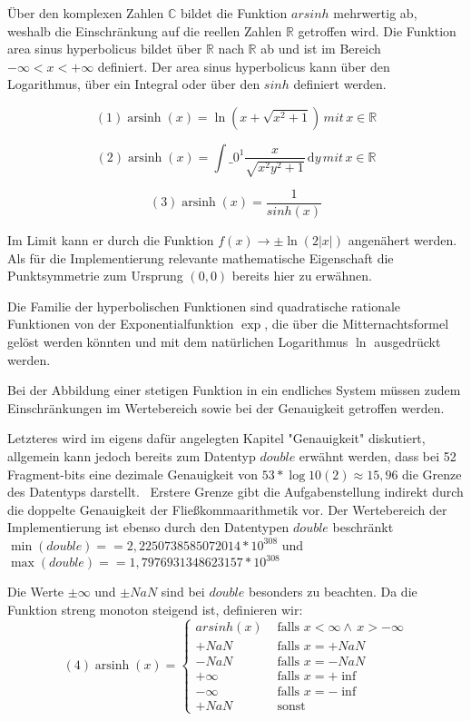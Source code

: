 \documentclass[course=erap] {aspdoc}
\begin{document}
    Über den komplexen Zahlen $\mathbb{C}$ bildet die Funktion $arsinh$ mehrwertig ab, weshalb die Einschränkung auf die reellen Zahlen $\mathbb{R}$ getroffen wird.
    Die Funktion area sinus hyperbolicus bildet über $\mathbb{R}$ nach $\mathbb{R}$ ab und ist im Bereich $-\infty < x < + \infty$ definiert.
    Der area sinus hyperbolicus kann über den Logarithmus, über ein Integral oder über den $sinh$ definiert werden.

    $$ (1) \operatorname{arsinh}(x) = \ln \left(x + \sqrt{x^2 + 1} \right) \, mit \, x \in \mathbb{R}$$

    $$ (2) \operatorname{arsinh}(x) = \int\_{0}^{1} \frac{x}{\sqrt{x^2 y^2 + 1}} \,\mathrm{d}y \, mit \, x \in \mathbb{R} $$

    $$ (3) \operatorname{arsinh}(x) = \frac{1}{sinh(x)} $$

    Im Limit kann er durch die Funktion $f(x)\to \pm \ln(2|x|)$ angenähert werden.
    Als für die Implementierung relevante mathematische Eigenschaft die Punktsymmetrie zum Ursprung $(0,0)$ bereits hier zu erwähnen.


    Die Familie der hyperbolischen Funktionen sind quadratische rationale Funktionen von der Exponentialfunktion $\exp$,
    die über die Mitternachtsformel gelöst werden könnten und mit dem natürlichen Logarithmus $\ln$ ausgedrückt werden.


    Bei der Abbildung einer stetigen Funktion in ein endliches System müssen zudem Einschränkungen im Wertebereich sowie bei der Genauigkeit getroffen werden.


    Letzteres wird im eigens dafür angelegten Kapitel "Genauigkeit" diskutiert, allgemein kann jedoch bereits zum Datentyp $double$ erwähnt werden, dass bei 52 Fragment-bits eine dezimale Genauigkeit von $53*\log10(2) \approx 15,96$ die Grenze des Datentyps darstellt.~\cite{StandardforBinaryFloating-PointArithmetic}
    Erstere Grenze gibt die Aufgabenstellung indirekt durch die doppelte Genauigkeit der Fließkommaarithmetik vor.
    Der Wertebereich der Implementierung ist ebenso durch den Datentypen $double$ beschränkt $\min(double) =  = 2,2250738585072014* 10^308$ und $\max(double) =  = 1,7976931348623157 * 10^308$


    Die Werte $\pm \infty$ und $\pm NaN$ sind bei $double$ besonders zu beachten.
    Da die Funktion streng monoton steigend ist, definieren wir:
    \[(4) \operatorname{arsinh}(x) =
    \begin{cases}
        arsinh(x)     & \text{ falls } x < \infty \wedge \, x > -\infty \\
        +NaN  & \text{ falls } x = +NaN \\
        -NaN  & \text{ falls } x = -NaN \\
        +\infty     & \text{ falls } x = +\inf \\
        -\infty     & \text{ falls } x = -\inf \\
        +NaN     & \text{ sonst }

    \end{cases}\]
\end{document}
